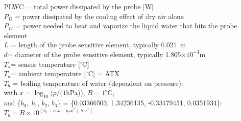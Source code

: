 \documentclass[
  english,
]{book}
\begin{document}
PLWC = total power dissipated by the probe {[}W{]}\\
\(P_{D}\) = power dissipated
by the cooling effect of dry air alone\\
\(P_{W}\) = power needed to heat and vaporize the liquid water that
hits the probe element\\
\(L\) = length
of the probe sensitive element,
typically 0.021~m\\
\(d\)= diameter of the probe sensitive
element, typically 1.805\(\times10^{-3}\)m\\
\(T_{s}\)= sensor temperature
{[}\(^{\circ}\)C{]}\\
\(T_{a}\)= ambient temperature {[}\(^{\circ}\)C{]} = ATX\\
\(T_{b}\) =
boiling temperature of water (dependent on pressure):\\
\hspace*{0.333em}\hspace*{0.333em}\hspace*{0.333em}\hspace*{0.333em}\hspace*{0.333em}\hspace*{0.333em}\hspace*{0.333em}\hspace*{0.333em}\hspace*{0.333em}with \(x=\log_{10}(p/(1\)hPa)), \(B=1^{\circ}\)C,\\
\hspace*{0.333em}\hspace*{0.333em}\hspace*{0.333em}\hspace*{0.333em}\hspace*{0.333em}\hspace*{0.333em}\hspace*{0.333em}\hspace*{0.333em}\hspace*{0.333em}and \{\(b_{0},\) \(b_{1}\), \(b_{2}\), \(b_{3}\)\} = \{0.03366503, 1.34236135,
-0.33479451, 0.0351934\}:\\
\hspace*{0.333em}\hspace*{0.333em}\hspace*{0.333em}\hspace*{0.333em}\hspace*{0.333em}\hspace*{0.333em}\hspace*{0.333em}\hspace*{0.333em}\hspace*{0.333em}\hspace*{0.333em}\(T_{b}=B\times10^{(b_{0}+b_{1}x+b_{2}x^{2}+b_{3}x^{3})}\)\\
\end{document}
